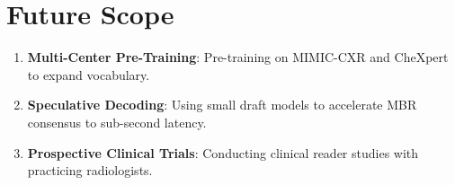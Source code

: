 \documentclass[12pt,a4paper]{report}
\begin{document}
\section{Future Scope}
\begin{enumerate}
    \item \textbf{Multi-Center Pre-Training}: Pre-training on MIMIC-CXR and CheXpert to expand vocabulary.
    \item \textbf{Speculative Decoding}: Using small draft models to accelerate MBR consensus to sub-second latency.
    \item \textbf{Prospective Clinical Trials}: Conducting clinical reader studies with practicing radiologists.
\end{enumerate}

\end{document}

